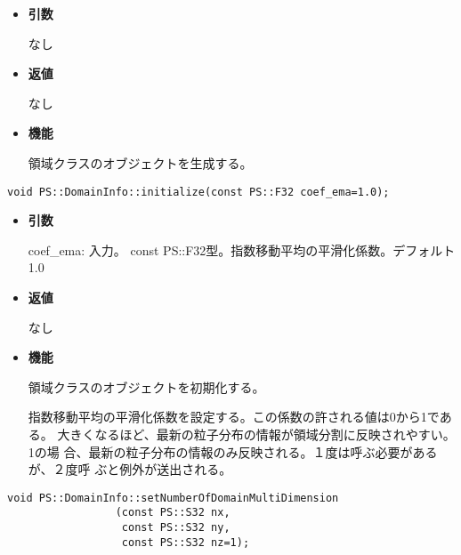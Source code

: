 \begin{itemize}

\item {\bf 引数}

なし

\item {\bf 返値}

なし

\item {\bf 機能}

領域クラスのオブジェクトを生成する。

\end{itemize}


\begin{screen}
\begin{verbatim}
void PS::DomainInfo::initialize(const PS::F32 coef_ema=1.0);
\end{verbatim}
\end{screen}

\begin{itemize}

\item {\bf 引数}

coef\_ema: 入力。 const PS::F32型。指数移動平均の平滑化係数。デフォルト1.0

\item {\bf 返値}

なし

\item {\bf 機能}

領域クラスのオブジェクトを初期化する。

指数移動平均の平滑化係数を設定する。この係数の許される値は0から1である。
大きくなるほど、最新の粒子分布の情報が領域分割に反映されやすい。1の場
合、最新の粒子分布の情報のみ反映される。１度は呼ぶ必要があるが、２度呼
ぶと例外が送出される。

\end{itemize}


\begin{screen}
\begin{verbatim}
void PS::DomainInfo::setNumberOfDomainMultiDimension
                 (const PS::S32 nx,
                  const PS::S32 ny,
                  const PS::S32 nz=1);
\end{verbatim}
\end{screen}

